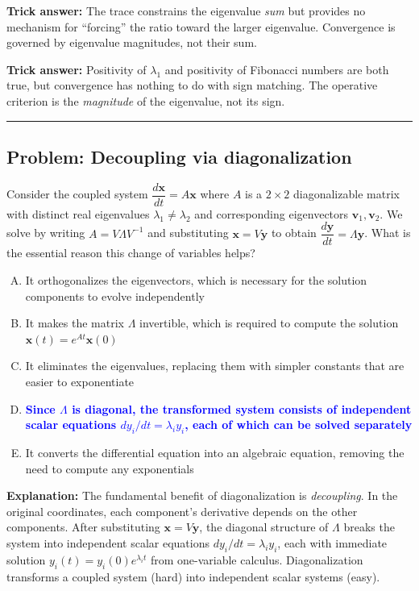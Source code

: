 \documentclass[12pt]{amsart}
\newcommand{\divider}{
  \vspace{-1em}
  \noindent
  \raisebox{-0.15ex}{\textbullet}%
  \hspace{0.5em}%
  \rule[0.5ex]{0.95\textwidth}{1.0pt}%
  \hspace{0.5em}%
  \raisebox{-0.15ex}{\textbullet}%
  \vspace{0em}
}
\begin{document}
\textbf{Trick answer:}
The trace constrains the eigenvalue \emph{sum} but provides no mechanism
for ``forcing'' the ratio toward the larger eigenvalue. Convergence is
governed by eigenvalue magnitudes, not their sum.

\textbf{Trick answer:}
Positivity of $\lambda_1$ and positivity of Fibonacci numbers are both
true, but convergence has nothing to do with sign matching. The operative
criterion is the \emph{magnitude} of the eigenvalue, not its sign.

\divider

\subsection*{Problem: Decoupling via diagonalization}

Consider the coupled system $\dfrac{d\mathbf{x}}{dt} = A\mathbf{x}$ where
$A$ is a $2 \times 2$ diagonalizable matrix with distinct real eigenvalues
$\lambda_1 \neq \lambda_2$ and corresponding eigenvectors
$\mathbf{v}_1, \mathbf{v}_2$.
We solve by writing $A = V\Lambda V^{-1}$ and substituting
$\mathbf{x} = V\mathbf{y}$ to obtain
$\dfrac{d\mathbf{y}}{dt} = \Lambda\mathbf{y}$.
What is the essential reason this change of variables helps?

\begin{enumerate}[(A)]
\item It orthogonalizes the eigenvectors, which is necessary for the
      solution components to evolve independently
\item It makes the matrix $\Lambda$ invertible, which is required to
      compute the solution $\mathbf{x}(t) = e^{At}\mathbf{x}(0)$
\item It eliminates the eigenvalues, replacing them with simpler constants
      that are easier to exponentiate
\item \textcolor{blue}{\textbf{Since $\Lambda$ is diagonal, the
      transformed system consists of independent scalar equations
      $dy_i/dt = \lambda_i y_i$, each of which can be solved separately}}
\item It converts the differential equation into an algebraic equation,
      removing the need to compute any exponentials
\end{enumerate}

\textbf{Explanation:}
The fundamental benefit of diagonalization is \emph{decoupling}. In the
original coordinates, each component's derivative depends on the other
components. After substituting $\mathbf{x} = V\mathbf{y}$, the diagonal
structure of $\Lambda$ breaks the system into independent scalar equations
$dy_i/dt = \lambda_i y_i$, each with immediate solution
$y_i(t) = y_i(0)e^{\lambda_i t}$ from one-variable calculus.
Diagonalization transforms a coupled system (hard) into independent
scalar systems (easy).
\end{document}
